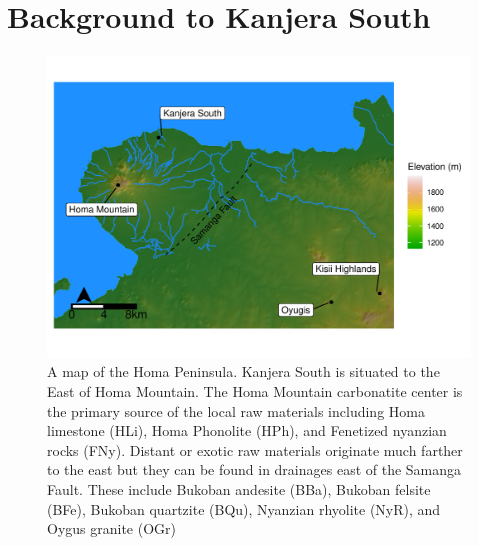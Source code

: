 \documentclass[]{elsarticle} %
\makeatletter
\def\maxwidth{\ifdim\Gin@nat@width>\linewidth\linewidth
\else\Gin@nat@width\fi}
\let\Oldincludegraphics\includegraphics
\renewcommand{\includegraphics}[1]{\Oldincludegraphics[width=\maxwidth]{#1}}
\makeatother
\begin{document}
\hypertarget{background-to-kanjera-south}{%
\section{Background to Kanjera
South}\label{background-to-kanjera-south}}

\begin{figure}
\centering
\includegraphics{Reeves_Braun_et_al_2020_Kanjera_South_JHE_files/figure-latex/fig-2-1.pdf}
\caption{A map of the Homa Peninsula. Kanjera South is situated to the
East of Homa Mountain. The Homa Mountain carbonatite center is the
primary source of the local raw materials including Homa limestone
(HLi), Homa Phonolite (HPh), and Fenetized nyanzian rocks (FNy). Distant
or exotic raw materials originate much farther to the east but they can
be found in drainages east of the Samanga Fault. These include Bukoban
andesite (BBa), Bukoban felsite (BFe), Bukoban quartzite (BQu), Nyanzian
rhyolite (NyR), and Oygus granite (OGr) \label{map}}
\end{figure}
\end{document}
